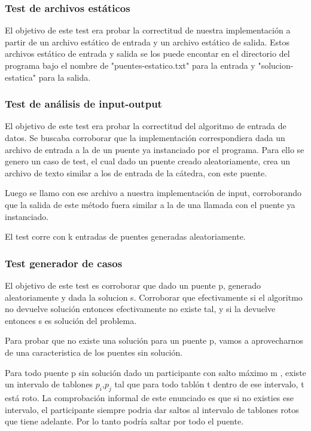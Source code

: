 \subsubsection{Test de archivos est\'aticos}

El objetivo de este test era probar la correctitud de nuestra implementaci\'on a partir de un archivo est\'atico de entrada y un archivo est\'atico de salida.
Estos archivos est\'atico de entrada y salida se los puede encontar en el directorio del programa bajo el nombre de "puentes-estatico.txt" para la entrada y "solucion-estatica" para la salida.


\subsubsection{Test de an\'alisis de input-output}

El objetivo de este test era probar la correctitud del algoritmo de entrada de datos.
Se buscaba corroborar que la implementaci\'on correspondiera dada un archivo de entrada a la de un puente ya instanciado por el programa.
Para ello se genero un caso de test, el cual dado un puente creado aleatoriamente, crea un archivo de texto similar a los de entrada de la c\'atedra, con este puente. 

Luego se llamo con ese archivo a nuestra implementaci\'on de input, corroborando que la salida de este m\'etodo fuera similar a la de una llamada con el puente ya instanciado.

El test corre con k entradas de puentes generadas aleatoriamente.

\subsubsection{Test generador de casos}

El objetivo de este test es corroborar que dado un puente p, generado aleatoriamente y dada la solucion s. Corroborar que efectivamente si el algoritmo no devuelve soluci\'on entonces efectivamente no existe tal, y si la devuelve entonces s es soluci\'on del problema.

Para probar que no existe una soluci\'on para un puente p, vamos a aprovecharnos de una caracteristica de los puentes sin soluci\'on.

Para todo puente p sin soluci\'on dado un participante con salto m\'aximo m , existe un intervalo de tablones $p_{i}$,$p_{j}$ tal que para todo tabl\'on t dentro de ese intervalo, t est\'a roto.
La comprobaci\'on informal de este enunciado es que si no existies ese intervalo, el participante siempre podria dar saltos al intervalo de tablones rotos que tiene adelante. Por lo tanto podr\'ia saltar por todo el puente.

